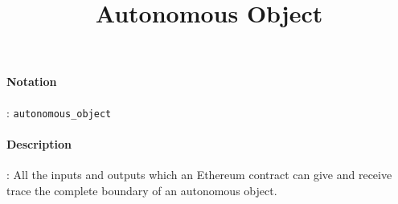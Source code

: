 \documentclass[10pt,a4paper,oneside]{scrartcl}
\author{}
\title{Autonomous Object}
\date{}
\begin{document}
\maketitle
\paragraph{Notation}: \texttt{autonomous\_object}
\paragraph{Description}: All the inputs and outputs which an Ethereum contract can give and receive trace the complete boundary of an autonomous object. 
\end{document}
